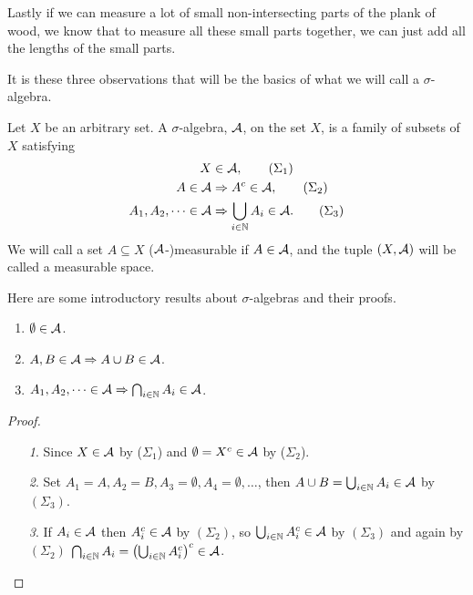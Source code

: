 \documentclass[../../textbook.tex]{subfiles}
\begin{document}
Lastly if we can measure a lot of small non-intersecting parts of the plank of wood, we know that to measure all these small parts together, we can just add all the lengths of the small parts.

It is these three observations that will be the basics of what we will call a $\sigma$-algebra.

\begin{definition}
Let $X$ be an arbitrary set. A $\sigma$-algebra, $\mathcal{A}$, on the set $X$, is a family of subsets of $X$ satisfying
\begin{align*}
    X &\in \mathcal{A}, \tag{$\Sigma_1$} \label{eq: sigma1}\\
    A\in \mathcal{A} &\Rightarrow A^{c}\in \mathcal{A}, \tag{$\Sigma_2$} \label{eq: sigma2} \\
    A_1, A_2, \dots \in \mathcal{A} &\Rightarrow \bigcup_{i\in \mathbb{N}}A_i \in \mathcal{A}. \tag{$\Sigma_3$} \label{eq: sigma3}
\end{align*}
We will call a set $A\subseteq X$ ($\mathcal{A}$-)measurable if $A\in \mathcal{A}$, and the tuple $(X, \mathcal{A})$ will be called a measurable space.
\end{definition}

\begin{proposition}
Here are some introductory results about $\sigma$-algebras and their proofs.
\begin{enumerate}
    \item $\emptyset \in \mathcal{A}$.
    \item $A,B\in \mathcal{A} \Rightarrow A\cup B \in \mathcal{A}$.
    \item $A_1, A_2, \dots \in \mathcal{A} \Rightarrow \bigcap_{i\in \mathbb{N}}A_i\in \mathcal{A}$.
\end{enumerate}
\end{proposition}
\begin{proof}
\begin{enumerate}
\item[\emph{1}.] Since $X\in \mathcal{A}$ by ($\Sigma_1$) and $\emptyset=X^c\in \mathcal{A}$ by ($\Sigma_2$).
\item[\emph{2}.] Set $A_1=A, A_2=B, A_3=\emptyset, A_4=\emptyset, \dots$, then $A\cup B=\bigcup_{i\in \mathbb{N}}A_i\in \mathcal{A}$ by $(\Sigma_3)$.
\item[\emph{3}.] If $A_i\in \mathcal{A}$ then $A_i^c\in \mathcal{A}$ by $(\Sigma_2)$, so $\bigcup_{i\in \mathbb{N}}A_i^c\in \mathcal{A}$ by $(\Sigma_3)$ and again by $(\Sigma_2)$ $\bigcap_{i\in \mathbb{N}}A_i=\left(\bigcup_{i\in \mathbb{N}}A_i^c\right)^c\in \mathcal{A}$.
\end{enumerate}
\end{proof}
\end{document}
